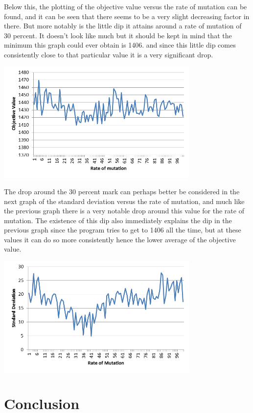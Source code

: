 \par
Below this, the plotting of the objective value versus the rate of mutation can be found, and it can be seen that there seems to be a very slight decreasing factor in there. But more notably is the little dip it attains around a rate of mutation of 30 percent. It doesn’t look like much but it should be kept in mind that the minimum this graph could ever obtain is 1406. and since this little dip comes consistently close to that particular value it is a very significant drop.
\par
\begin{centering}
\includegraphics[height=6cm]{OVRM}
\end{centering}
The drop around the 30 percent mark can perhaps better be considered in the next graph of the standard deviation versus the rate of mutation, and much like the previous graph there is a very notable drop around this value for the rate of mutation. The existence of this dip also immediately explains the dip in the previous graph since the program tries to get to 1406 all the time, but at these values it can do so more consistently hence the lower average of the objective value.
\par
\begin{centering}
\includegraphics[height=6cm]{SDRM}
\end{centering}
\section{Conclusion}

